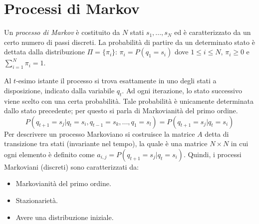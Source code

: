 \documentclass[a4paper,oneside,titlepage]{book}
\begin{document}
\section{Processi di Markov}
Un \textit{processo di Markov} è costituito da $N$ stati $s_1, ..., s_N$ ed è caratterizzato da un certo numero di passi discreti. La probabilità di partire da un determinato stato è dettata dalla distribuzione $\Pi = \{ \pi_i \}: \, \pi_i = P(q_1=s_i)$ dove $1 \leq i \leq N$, $\pi_i \geq 0$ e $\sum_{i=1}^N \pi_i=1$.

Al $t$-esimo istante il processo si trova esattamente in uno degli stati a disposizione, indicato dalla variabile $q_t$. Ad ogni iterazione, lo stato successivo viene scelto con una certa probabilità. Tale probabilità è unicamente determinata dallo stato precedente; per questo si parla di Markovianità del primo ordine.
\[ P(q_{t+1}=s_j | q_t=s_i, q_{t-1}=s_k, ..., q_1=s_l) = P(q_{t+1}=s_j | q_t=s_i) \]
Per descrivere un processo Markoviano si costruisce la matrice $A$ detta di transizione tra stati (invariante nel tempo), la quale è una matrice $N \times N$ in cui ogni elemento è definito come $a_{i,j} = P(q_{t+1}=s_j | q_t = s_i)$. Quindi, i processi Markoviani (discreti) sono caratterizzati da:
\begin{itemize}
    \item Markovianità del primo ordine.
    \item Stazionarietà.
    \item Avere una distribuzione iniziale.
\end{itemize}
\end{document}
